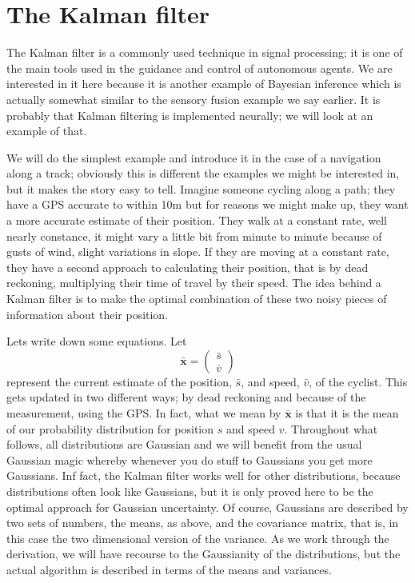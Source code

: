 \documentclass{article}
\begin{document}
\section*{The Kalman filter}

The Kalman filter is a commonly used technique in signal processing;
it is one of the main tools used in the guidance and control of
autonomous agents. We are interested in it here because it is another
example of Bayesian inference which is actually somewhat similar to
the sensory fusion example we say earlier. It is probably that Kalman
filtering is implemented neurally; we will look at an example of that.

We will do the simplest example and introduce it in the case of a
navigation along a track; obviously this is different the examples we
might be interested in, but it makes the story easy to tell. Imagine
someone cycling along a path; they have a GPS accurate to within 10m
but for reasons we might make up, they want a more accurate estimate
of their position. They walk at a constant rate, well nearly
constance, it might vary a little bit from minute to minute because of
gusts of wind, slight variations in slope. If they are moving at a
constant rate, they have a second approach to calculating their
position, that is by dead reckoning, multiplying their time of travel
by their speed. The idea behind a Kalman filter is to make the optimal
combination of these two noisy pieces of information about their
position.

Lets write down some equations. Let 
\begin{equation}
\mathbf{\bar{x}}=\left(\begin{array}{c}\bar{s}\\\bar{v}\end{array}\right)
\end{equation}
represent the current estimate of the position, $\bar{s}$, and speed,
$\bar{v}$, of the cyclist. This gets updated in two different ways; by
dead reckoning and because of the measurement, using the GPS. In fact,
what we mean by $\mathbf{\bar{x}}$ is that it is the mean of our
probability distribution for position $s$ and speed $v$. Throughout
what follows, all distributions are Gaussian and we will benefit from
the usual Gaussian magic whereby whenever you do stuff to Gaussians
you get more Gaussians. Inf fact, the Kalman filter works well for
other distributions, because distributions often look like Gaussians,
but it is only proved here to be the optimal approach for Gaussian
uncertainty. Of course, Gaussians are described by two sets of
numbers, the means, as above, and the covariance matrix, that is, in
this case the two dimensional version of the variance. As we work
through the derivation, we will have recourse to the Gaussianity of
the distributions, but the actual algorithm is described in terms of
the means and variances.
\end{document}
